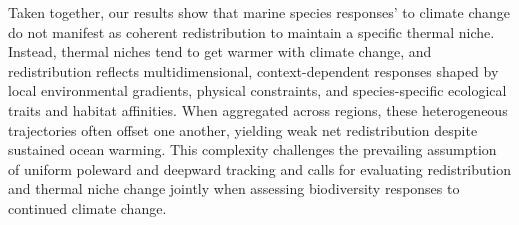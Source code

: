 \documentclass[9pt,twocolumn,twoside]{pnas-new}
\begin{document}
Taken together, our results show that marine species responses' to climate change do not manifest as coherent redistribution to maintain a specific thermal niche. Instead, thermal niches tend to get warmer with climate change, and redistribution reflects multidimensional, context-dependent responses shaped by local environmental gradients, physical constraints, and species-specific ecological traits and habitat affinities. When aggregated across regions, these heterogeneous trajectories often offset one another, yielding weak net redistribution despite sustained ocean warming. This complexity challenges the prevailing assumption of uniform poleward and deepward tracking and calls for evaluating redistribution and thermal niche change jointly when assessing biodiversity responses to continued climate change. 







%






\end{document}
